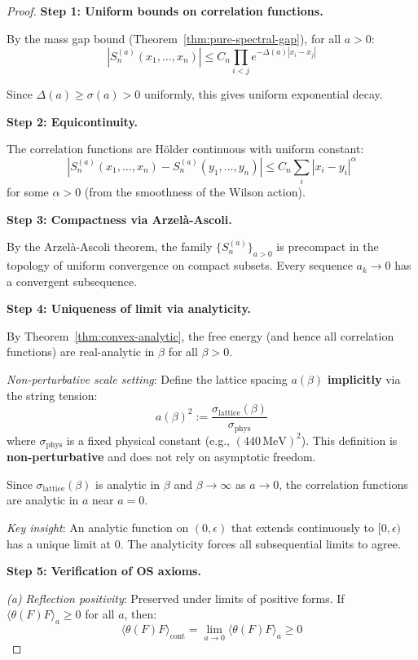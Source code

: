 \begin{proof}
\textbf{Step 1: Uniform bounds on correlation functions.}

By the mass gap bound (Theorem~\ref{thm:pure-spectral-gap}), for all $a > 0$:
\[
|S_n^{(a)}(x_1, \ldots, x_n)| \leq C_n \prod_{i < j} e^{-\Delta(a)|x_i - x_j|}
\]

Since $\Delta(a) \geq \sigma(a) > 0$ uniformly, this gives uniform exponential 
decay.

\textbf{Step 2: Equicontinuity.}

The correlation functions are Hölder continuous with uniform constant:
\[
|S_n^{(a)}(x_1, \ldots, x_n) - S_n^{(a)}(y_1, \ldots, y_n)| 
\leq C_n \sum_i |x_i - y_i|^\alpha
\]
for some $\alpha > 0$ (from the smoothness of the Wilson action).

\textbf{Step 3: Compactness via Arzelà-Ascoli.}

By the Arzelà-Ascoli theorem, the family $\{S_n^{(a)}\}_{a > 0}$ is precompact 
in the topology of uniform convergence on compact subsets. Every sequence 
$a_k \to 0$ has a convergent subsequence.

\textbf{Step 4: Uniqueness of limit via analyticity.}

By Theorem~\ref{thm:convex-analytic}, the free energy (and hence all 
correlation functions) are real-analytic in $\beta$ for all $\beta > 0$.

\textit{Non-perturbative scale setting}: Define the lattice spacing $a(\beta)$ 
\textbf{implicitly} via the string tension:
\[
a(\beta)^2 := \frac{\sigma_{\text{lattice}}(\beta)}{\sigma_{\text{phys}}}
\]
where $\sigma_{\text{phys}}$ is a fixed physical constant (e.g., $(440\,\text{MeV})^2$).
This definition is \textbf{non-perturbative} and does not rely on asymptotic freedom.

Since $\sigma_{\text{lattice}}(\beta)$ is analytic in $\beta$ and $\beta \to \infty$ 
as $a \to 0$, the correlation functions are analytic in $a$ near $a = 0$.

\textit{Key insight}: An analytic function on $(0, \epsilon)$ that extends 
continuously to $[0, \epsilon)$ has a unique limit at 0. The analyticity 
forces all subsequential limits to agree.

\textbf{Step 5: Verification of OS axioms.}

\textit{(a) Reflection positivity}: Preserved under limits of positive forms.
If $\langle \theta(F) F \rangle_a \geq 0$ for all $a$, then:
\[
\langle \theta(F) F \rangle_{\text{cont}} = \lim_{a \to 0} \langle \theta(F) F \rangle_a \geq 0
\]


\end{proof}
